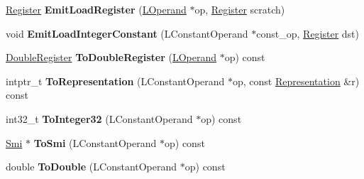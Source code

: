 \begin{DoxyCompactItemize}
\item 
\hyperlink{structv8_1_1internal_1_1_register}{Register} {\bfseries Emit\+Load\+Register} (\hyperlink{classv8_1_1internal_1_1_l_operand}{L\+Operand} $\ast$op, \hyperlink{structv8_1_1internal_1_1_register}{Register} scratch)\hypertarget{classv8_1_1internal_1_1_l_code_gen_aae04184e582568b386844732951cdda2}{}\label{classv8_1_1internal_1_1_l_code_gen_aae04184e582568b386844732951cdda2}

\item 
void {\bfseries Emit\+Load\+Integer\+Constant} (L\+Constant\+Operand $\ast$const\+\_\+op, \hyperlink{structv8_1_1internal_1_1_register}{Register} dst)\hypertarget{classv8_1_1internal_1_1_l_code_gen_aff35fdd79bc49bea0e6b85911c93df03}{}\label{classv8_1_1internal_1_1_l_code_gen_aff35fdd79bc49bea0e6b85911c93df03}

\item 
\hyperlink{structv8_1_1internal_1_1_double_register}{Double\+Register} {\bfseries To\+Double\+Register} (\hyperlink{classv8_1_1internal_1_1_l_operand}{L\+Operand} $\ast$op) const \hypertarget{classv8_1_1internal_1_1_l_code_gen_aad85fae6ac6f5060e2d7b220ab87ede4}{}\label{classv8_1_1internal_1_1_l_code_gen_aad85fae6ac6f5060e2d7b220ab87ede4}

\item 
intptr\+\_\+t {\bfseries To\+Representation} (L\+Constant\+Operand $\ast$op, const \hyperlink{classv8_1_1internal_1_1_representation}{Representation} \&r) const \hypertarget{classv8_1_1internal_1_1_l_code_gen_a2a4cd68e415f9a85251295269fd6a125}{}\label{classv8_1_1internal_1_1_l_code_gen_a2a4cd68e415f9a85251295269fd6a125}

\item 
int32\+\_\+t {\bfseries To\+Integer32} (L\+Constant\+Operand $\ast$op) const \hypertarget{classv8_1_1internal_1_1_l_code_gen_a477ff533f07d93b0e1ca5f9290beea36}{}\label{classv8_1_1internal_1_1_l_code_gen_a477ff533f07d93b0e1ca5f9290beea36}

\item 
\hyperlink{classv8_1_1internal_1_1_smi}{Smi} $\ast$ {\bfseries To\+Smi} (L\+Constant\+Operand $\ast$op) const \hypertarget{classv8_1_1internal_1_1_l_code_gen_a9aa0394d9bdd7a07b4190d08edb0a8e6}{}\label{classv8_1_1internal_1_1_l_code_gen_a9aa0394d9bdd7a07b4190d08edb0a8e6}

\item 
double {\bfseries To\+Double} (L\+Constant\+Operand $\ast$op) const \hypertarget{classv8_1_1internal_1_1_l_code_gen_a9859cf602181324ec10970ab93416aaa}{}\label{classv8_1_1internal_1_1_l_code_gen_a9859cf602181324ec10970ab93416aaa}


\end{DoxyCompactItemize}
